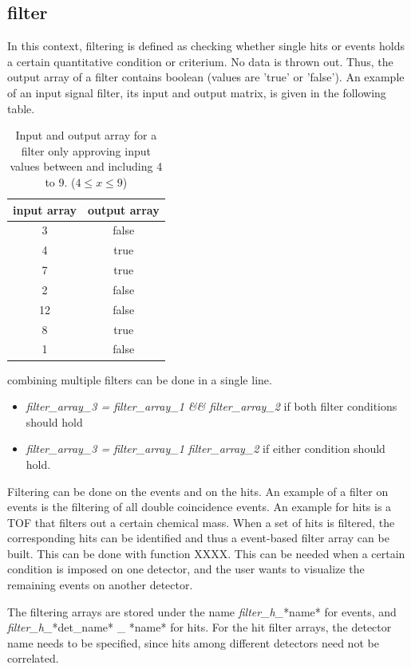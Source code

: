 \newpage
\subsection{filter}
In this context, filtering is defined as checking whether single hits or events holds a certain quantitative condition or criterium. No data is thrown out. Thus, the output array of a filter contains boolean (values are 'true' or 'false'). An example of an input signal filter, its input and output matrix, is given in the following table.

\begin{table}
\center
\caption{Input and output array for a filter only approving input values between and including 4 to 9. ($4 \leq x \leq 9$)}
\begin{tabular}{cc}
input array 	& output array\\
\hline
3				& false\\
4				& true\\
7				& true\\
2 				& false\\
12				& false\\
8				& true\\
1 				& false\\
\end{tabular}
\end{table}

combining multiple filters can be done in a single line.
\begin{itemize}
\item \emph{filter\_array\_3  = filter\_array\_1 \&\& filter\_array\_2} if both filter conditions should hold
\item \emph{filter\_array\_3  = filter\_array\_1 \textbar\textbar filter\_array\_2} if either condition should hold.
\end{itemize}

Filtering can be done on the events and on the hits. An example of a filter on events is the filtering of all double coincidence events. An example for hits is a TOF that filters out a certain chemical mass. When a set of hits is filtered, the corresponding hits can be identified and thus a event-based filter array can be built. This can be done with function XXXX. This can be needed when a certain condition is imposed on one detector, and the user wants to visualize the remaining events on another detector.

The filtering arrays are stored under the name \emph{filter\_h\_}*name* for events, and \emph{filter\_h\_}*det\_name* \_ *name* for hits. For the hit filter arrays, the detector name needs to be specified, since hits among different detectors need not be correlated. 


